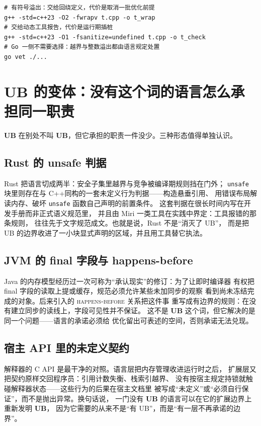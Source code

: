 \documentclass[12pt,a4paper,fontset=fandol]{ctexbook}
\newcommand{\Tp}[1]{\texttt{#1}}
\newcommand{\Lang}[1]{\textsf{#1}}
\newcommand{\CPP}{\Lang{C++}}
\newcommand{\UB}{\textbf{\textsf{UB}}}
\newcommand{\Clause}[1]{\textsc{\small #1}}
\newcommand{\Mx}[1]{\textsf{#1}}
\begin{document}
\begin{lstlisting}[style=shellstyle, caption={同一份 C++ 源码在“定义良好的邻居语言”与“撤回承诺的语言”里的不同处置：命令行侧的对照}]
# 有符号溢出：交给回绕定义，代价是取消一批优化前提
g++ -std=c++23 -O2 -fwrapv t.cpp -o t_wrap
# 交给动态工具报告，代价是运行期插桩
g++ -std=c++23 -O1 -fsanitize=undefined t.cpp -o t_check
# Go 一侧不需要选择：越界与整数溢出都由语言规定处置
go vet ./...
\end{lstlisting}

\section{UB 的变体：没有这个词的语言怎么承担同一职责}\label{sec:ub02-variants}

\UB{} 在别处不叫 \UB{}，但它承担的职责一件没少。三种形态值得单独认识。

\subsection{Rust 的 unsafe 判据}\label{sec:ub02-rust}

Rust 把语言切成两半：安全子集里越界与竞争被编译期规则挡在门外；
\Tp{unsafe} 块里则存在与 \CPP 同构的一套未定义行为判据——构造悬垂引用、
用错误布局解读内存、破坏 \Tp{unsafe} 函数自己声明的前置条件。
这套判据在很长时间内写在开发手册而非正式语义规范里，
并且由 \Mx{Miri} 一类工具在实践中界定：工具报错的那条规则，
往往先于文字规范成文。也就是说，Rust 不是“消灭了 UB”，
而是把 UB 的边界收进了一小块显式声明的区域，并且用工具替它执法。

\subsection{JVM 的 final 字段与 happens-before}\label{sec:ub02-jvm}

Java 的内存模型经历过一次可称为“承认现实”的修订：为了让即时编译器
有权把 final 字段的读取上提或缓存，规范必须允许某些未加同步的观察
看到尚未冻结完成的对象。后来引入的 \Clause{happens-before} 关系把这件事
重写成有边界的规则：在没有建立同步的读线上，字段可见性并不保证。
这不是 \UB{} 这个词，但它解决的是同一个问题——语言的承诺必须给
优化留出可表述的空间，否则承诺无法兑现。

\subsection{宿主 API 里的未定义契约}\label{sec:ub02-host}

解释器的 C API 是最干净的对照。语言层把内存管理收进运行时之后，
扩展层又把契约原样交回程序员：引用计数失衡、栈索引越界、
没有按宿主规定持锁就触碰解释器状态——这些行为的后果在宿主文档里
被写成“未定义”或“必须自行保证”，而不是抛出异常。换句话说，
一门没有 \UB{} 的语言可以在它的扩展边界上重新发明 \UB{}，
因为它需要的从来不是“有 UB”，而是“有一层不再承诺的边界”。
\end{document}
